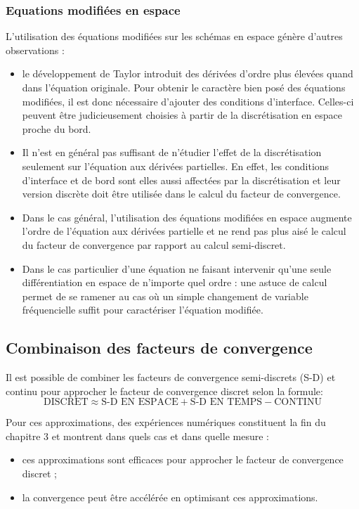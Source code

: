 \subsubsection*{Equations modifiées en espace}
L'utilisation des équations modifiées sur les schémas en espace
génère d'autres observations :
\begin{itemize}
	\item 
	le développement de Taylor introduit des dérivées
d'ordre plus élevées quand dans l'équation originale. Pour
obtenir le caractère bien posé des équations modifiées, il est donc
nécessaire d'ajouter des conditions d'interface. Celles-ci peuvent
être judicieusement choisies à partir de la discrétisation en espace
proche du bord.
	\item Il n'est en général pas suffisant de n'étudier
		l'effet de la discrétisation seulement sur
		l'équation aux dérivées partielles. En effet,
		les conditions d'interface et de bord sont
		elles aussi affectées par la discrétisation et
		leur version discrète doit être utilisée
		dans le calcul du facteur de convergence.
	\item Dans le cas général, l'utilisation des équations
	modifiées en espace augmente l'ordre de l'équation aux
	dérivées partielle et ne rend pas plus aisé
	le calcul du facteur de convergence par rapport
		au calcul semi-discret.
	\item Dans le cas particulier d'une équation ne faisant
	intervenir
	qu'une seule différentiation en espace de n'importe
	quel ordre :
	une astuce de calcul permet de se ramener au cas où un simple
	changement de variable fréquencielle suffit pour caractériser
		l'équation modifiée.
\end{itemize}
%
\subsection*{Combinaison des facteurs de convergence}
Il est possible de combiner les facteurs
de convergence semi-discrets (S-D) et continu pour approcher le
facteur de convergence discret selon la formule:
\begin{equation}
	\text{DISCRET} \approx
	\text{S-D EN ESPACE} +
	\text{S-D EN TEMPS} -
	\text{CONTINU}
\end{equation}
%
\par
Pour ces approximations, des expériences numériques constituent la fin
du chapitre 3 et montrent dans quels cas et dans quelle mesure :
\begin{itemize}
	\item
ces approximations sont efficaces pour approcher le facteur
de convergence discret ;
	\item
la convergence
peut être accélérée en optimisant ces approximations.
\end{itemize}
